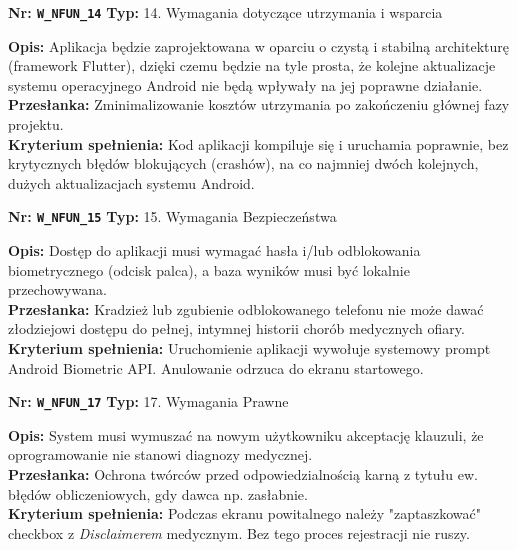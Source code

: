 \documentclass[11pt, a4paper]{article}
\newcommand{\req}[1]{\texttt{#1}}
\begin{document}
\begin{mdframed}[style=reqheader]
  \textbf{Nr: \req{W\_NFUN\_14}} \hfill \textbf{Typ:} 14. Wymagania dotyczące utrzymania i wsparcia
\end{mdframed}
\begin{mdframed}[style=reqcard]
  \textbf{Opis:} Aplikacja będzie zaprojektowana w oparciu o czystą i stabilną architekturę (framework Flutter), dzięki czemu będzie na tyle prosta, że kolejne aktualizacje systemu operacyjnego Android nie będą wpływały na jej poprawne działanie. \\
  \textbf{Przesłanka:} Zminimalizowanie kosztów utrzymania po zakończeniu głównej fazy projektu. \\
  \textbf{Kryterium spełnienia:} Kod aplikacji kompiluje się i uruchamia poprawnie, bez krytycznych błędów blokujących (crashów), na co najmniej dwóch kolejnych, dużych aktualizacjach systemu Android.
\end{mdframed}

\begin{mdframed}[style=reqheader]
  \textbf{Nr: \req{W\_NFUN\_15}} \hfill \textbf{Typ:} 15. Wymagania Bezpieczeństwa
\end{mdframed}
\begin{mdframed}[style=reqcard]
  \textbf{Opis:} Dostęp do aplikacji musi wymagać hasła i/lub odblokowania biometrycznego (odcisk palca), a baza wyników musi być lokalnie przechowywana. \\
  \textbf{Przesłanka:} Kradzież lub zgubienie odblokowanego telefonu nie może dawać złodziejowi dostępu do pełnej, intymnej historii chorób medycznych ofiary. \\
  \textbf{Kryterium spełnienia:} Uruchomienie aplikacji wywołuje systemowy prompt Android Biometric API. Anulowanie odrzuca do ekranu startowego.
\end{mdframed}

\begin{mdframed}[style=reqheader]
  \textbf{Nr: \req{W\_NFUN\_17}} \hfill \textbf{Typ:} 17. Wymagania Prawne
\end{mdframed}
\begin{mdframed}[style=reqcard]
  \textbf{Opis:} System musi wymuszać na nowym użytkowniku akceptację klauzuli, że oprogramowanie nie stanowi diagnozy medycznej. \\
  \textbf{Przesłanka:} Ochrona twórców przed odpowiedzialnością karną z tytułu ew. błędów obliczeniowych, gdy dawca np. zasłabnie. \\
  \textbf{Kryterium spełnienia:} Podczas ekranu powitalnego należy "zaptaszkować" checkbox z \textit{Disclaimerem} medycznym. Bez tego proces rejestracji nie ruszy.
\end{mdframed}
\end{document}

